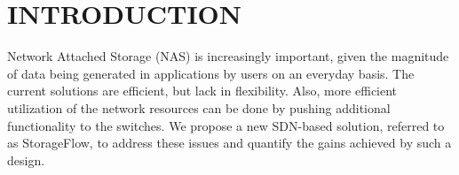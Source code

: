 %
%
%



\pagestyle{plain} %
\setcounter{page}{1}


\chapter{\uppercase {Introduction}}

Network Attached Storage (NAS) is increasingly important, given the magnitude of data being generated in applications by users on an everyday basis. The current solutions are efficient, but lack in flexibility. Also, more efficient utilization of the network resources can be done by pushing additional functionality to the switches. We propose a new SDN-based solution, referred to as StorageFlow, to address these issues and quantify the gains achieved by such a design.

